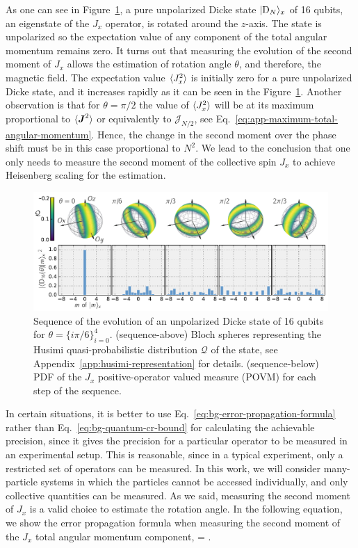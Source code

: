 As one can see in Figure~\ref{fig:vd-secuence-evo}, a pure unpolarized Dicke state $\vert{\ensuremath{\textnormal{D}_{N}}}\rangle_x$ of 16 qubits, an eigenstate of the $J_x$ operator, is rotated around the $z$-axis.
The state is unpolarized so the expectation value of any component of the total angular momentum remains zero.
It turns out that measuring the evolution of the second moment of $J_x$ allows the estimation of rotation angle $\theta$, and therefore, the magnetic field.
The expectation value $\langle{J_x^2}\rangle$ is initially zero for a pure unpolarized Dicke state, and it increases rapidly as it can be seen in the Figure~\ref{fig:vd-secuence-evo}.
Another observation is that for $\theta=\pi/2$ the value of $\langle{J_x^2}\rangle$ will be at its maximum proportional to $\langle{\ensuremath{\boldsymbol{J}}^2}\rangle$ or equivalently to $\mathcal{J}_{N/2}$, see Eq.~\eqref{eq:app-maximum-total-angular-momentum}.
Hence, the change in the second moment over the phase shift must be in this case proportional to $N^2$.
We lead to the conclusion that one only needs to measure the second moment of the collective spin $J_x$ to achieve Heisenberg scaling for the estimation.
\begin{figure}[htp]
  \centering
  \includegraphics[scale=.65]{img/VD_evolution_of_dicke.pdf}
  \caption[Sequence of Dicke state evolution]
  {Sequence of the evolution of an unpolarized Dicke state of 16 qubits for $\theta=\{i\pi/6\}_{i=0}^4$.
  (sequence-above) Bloch spheres representing the Husimi quasi-probabilistic distribution $\mathcal{Q}$ of the state, see Appendix~\ref{app:husimi-representation} for details.
  (sequence-below) PDF of the $J_x$ positive-operator valued measure (POVM) for each step of the sequence.}
  \label{fig:vd-secuence-evo}
\end{figure}

In certain situations, it is better to use Eq.~\eqref{eq:bg-error-propagation-formula} rather than Eq.~\eqref{eq:bg-quantum-cr-bound} for calculating the achievable precision, since it gives the precision for a particular operator to be measured in an experimental setup.
This is reasonable, since in a typical experiment, only a restricted set of operators can be measured.
In this work, we will consider many-particle systems in which the particles cannot be accessed individually, and only collective quantities can be measured.
As we said, measuring the second moment of $J_x$ is a valid choice to estimate the rotation angle.
In the following equation, we show the error propagation formula when measuring the second moment of the $J_x$ total angular momentum component,
\be
  \varinv{\theta} = .
  \label{eq:vd-error-propagation}
\ee

